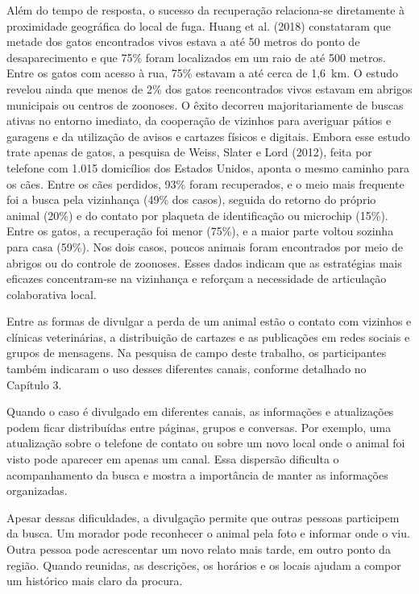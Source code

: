 Além do tempo de resposta, o sucesso da recuperação relaciona-se diretamente à proximidade geográfica do local de fuga. Huang et al. (2018) constataram que metade dos gatos encontrados vivos estava a até 50 metros do ponto de desaparecimento e que 75\% foram localizados em um raio de até 500 metros. Entre os gatos com acesso à rua, 75\% estavam a até cerca de 1,6~km. O estudo revelou ainda que menos de 2\% dos gatos reencontrados vivos estavam em abrigos municipais ou centros de zoonoses. O êxito decorreu majoritariamente de buscas ativas no entorno imediato, da cooperação de vizinhos para averiguar pátios e garagens e da utilização de avisos e cartazes físicos e digitais. Embora esse estudo trate apenas de gatos, a pesquisa de Weiss, Slater e Lord (2012), feita por telefone com 1.015 domicílios dos Estados Unidos, aponta o mesmo caminho para os cães. Entre os cães perdidos, 93\% foram recuperados, e o meio mais frequente foi a busca pela vizinhança (49\% dos casos), seguida do retorno do próprio animal (20\%) e do contato por plaqueta de identificação ou microchip (15\%). Entre os gatos, a recuperação foi menor (75\%), e a maior parte voltou sozinha para casa (59\%). Nos dois casos, poucos animais foram encontrados por meio de abrigos ou do controle de zoonoses. Esses dados indicam que as estratégias mais eficazes concentram-se na vizinhança e reforçam a necessidade de articulação colaborativa local.

Entre as formas de divulgar a perda de um animal estão o contato com vizinhos e clínicas veterinárias, a distribuição de cartazes e as publicações em redes sociais e grupos de mensagens. Na pesquisa de campo deste trabalho, os participantes também indicaram o uso desses diferentes canais, conforme detalhado no Capítulo 3.

Quando o caso é divulgado em diferentes canais, as informações e atualizações podem ficar distribuídas entre páginas, grupos e conversas. Por exemplo, uma atualização sobre o telefone de contato ou sobre um novo local onde o animal foi visto pode aparecer em apenas um canal. Essa dispersão dificulta o acompanhamento da busca e mostra a importância de manter as informações organizadas.

Apesar dessas dificuldades, a divulgação permite que outras pessoas participem da busca. Um morador pode reconhecer o animal pela foto e informar onde o viu. Outra pessoa pode acrescentar um novo relato mais tarde, em outro ponto da região. Quando reunidas, as descrições, os horários e os locais ajudam a compor um histórico mais claro da procura.

